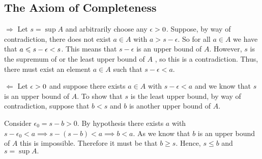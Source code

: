 \documentclass{report}
\begin{document}
\subsection{The Axiom of Completeness}

\bigskip



\begin{myproof}
\par
$\Rightarrow$
Let  $s = \sup A$ and arbitrarily choose any $\epsilon >0$. Suppose, by way of contradiction, there does not exist $a \in A$ with $a > s- \epsilon$. So for all $a \in A$ we have that $ a \leqslant s - \epsilon < s$. This means that $s-\epsilon$ is an upper bound  of $A$. However, $s$ is  the supremum of or the least upper bound  of $A$ , so this is a contradiction. Thus, there must exist an element $a \in A$ such that $s- \epsilon <a.$

\par
$\Leftarrow$
Let $ \epsilon > 0$ and suppose  there exists $a \in A$ with $s-\epsilon < a$ and we know that $s$ is an upper bound  of $A$. To show that $s$ is the least upper bound, by way of contradiction, suppose that $b<s$ and $b$ is another upper bound of $A$.
\par 
Consider $\epsilon_{0} = s - b > 0.$ By hypothesis there exists $a$ with $s - \epsilon_{0} < a \implies s - (s - b) < a \implies  b < a.$ As we know that $b$ is an upper bound of $A$ this is impossible. Therefore it must be that $b \geq s$. Hence, $s \leq b$ and $s = \sup A.$

\end{myproof}
\bigskip
\end{document}
